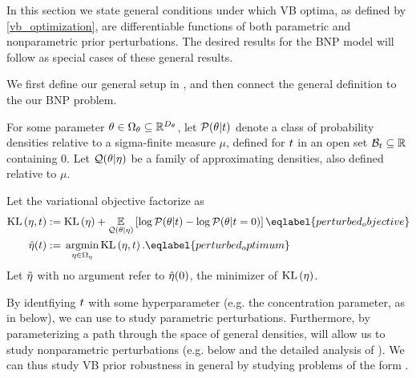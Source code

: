 In this section we state general conditions under which VB optima, as defined by
\eqref{vb_optimization}, are differentiable functions of both parametric and
nonparametric prior perturbations.  The desired results for the BNP model will
follow as special cases of these general results.

We first define our general setup in , and then connect
the general definition to the our BNP problem.

\begin{defn}
%
For some parameter $\theta \in \Omega_{\theta} \subseteq \mathbb{R}^{{D_{\theta}}}$, let
$\mathcal{P}(\theta \vert t)$ denote a class of probability densities relative to
a sigma-finite measure $\mu$, defined for $t$ in an open set $\mathcal{B}_t
\subseteq \mathbb{R}$ containing $0$.  Let $\mathcal{Q}(\theta \vert \eta)$ be a
family of approximating densities, also defined relative to $\mu$.

Let the variational objective factorize as
%
\begin{align}
%
\KL{\eta, \t} :={}&
    \KL{\eta} +
    \expect{\q(\theta \vert \eta)}
       {\log \p(\theta \vert \t) - \log \p(\theta \vert \t=0)}           \eqlabel{perturbed_objective}\\
\etaopt(\t) :={}& \argmin_{\eta \in \etadom} \KL{\eta, \t}.
    \eqlabel{perturbed_optimum}
%
\end{align}
%
Let $\hat\eta$ with no argument refer to $\hat\eta(0)$, the minimizer
of $\mathrm{KL}\left(\eta\right)$.
%
\end{defn}

By identfiying $t$ with some hyperparameter (e.g. the concentration parameter,
as in  below), we can use  to study
parametric perturbations.  Furthermore, by parameterizing a path through the
space of general densities,  will allow us to study
nonparametric perturbations (e.g.  below and the
detailed analysis of ).  We
can thus study VB prior robustness in general by studying problems of the
form .

